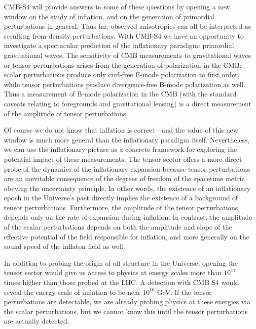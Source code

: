 CMB-S4 will provide answers to some of these questions by opening a new window on the study of inflation, and on the generation of primordial perturbations in general. Thus far, observed anisotropies can all be interpreted as resulting from density perturbations.  With CMB-S4 we have an opportunity to investigate a spectacular prediction of the inflationary paradigm: primordial gravitational waves. The sensitivity of CMB measurements to gravitational waves or tensor perturbations arises from the generation of polarization in the CMB: scalar perturbations produce only curl-free E-mode polarization to first order, while tensor perturbations produce divergence-free B-mode polarization as well. Thus a measurement of B-mode polarization in the CMB (with the standard caveats relating to foregrounds and gravitational lensing) is a direct measurement of the amplitude of tensor perturbations.

Of course we do not know that inflation is correct---and the value of this new window is much more general than the inflationary paradigm itself.  Nevertheless, we can use the inflationary picture as a concrete framework for exploring the potential impact of these measurements. The tensor sector offers a more direct probe of the dynamics of the inflationary expansion because tensor perturbations are an inevitable consequence of the degrees of freedom of the spacetime metric obeying the uncertainty principle. In other words, the existence of an inflationary epoch in the Universe's past directly implies the existence of a background of tensor perturbations. Furthermore, the amplitude of the tensor perturbations depends only on the rate of expansion during inflation. In contrast, the amplitude of the scalar perturbations depends on both the amplitude and slope of the effective potential of the field responsible for inflation, and more generally on the sound speed of the inflaton field as well.

In addition to probing the origin of all structure in the Universe, opening the tensor sector would give us access to physics at energy scales more than $10^{11}$ times higher than those probed at the LHC. A detection with CMB S4 would reveal the energy scale of inflation to be near $10^{16}$ GeV. If the tensor perturbations are detectable, we are already probing physics at these energies via the scalar perturbations, but we cannot know this until the tensor perturbations are actually detected. 


